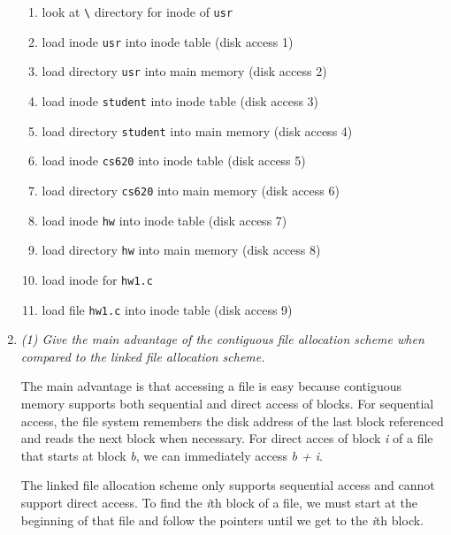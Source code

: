 \documentclass[letterpaper,11pt]{article}
\begin{document}
\begin{enumerate}
\begin{enumerate}
\item look at \verb+\+ directory for inode of \verb+usr+
\item load inode \verb+usr+ into inode table (disk access 1)
\item load directory \verb+usr+ into main memory (disk access 2)
\item load inode \verb+student+ into inode table (disk access 3)
\item load directory \verb+student+ into main memory (disk access 4)
\item load inode \verb+cs620+ into inode table (disk access 5)
\item load directory \verb+cs620+ into main memory (disk access 6)
\item load inode \verb+hw+ into inode table (disk access 7)
\item load directory \verb+hw+ into main memory (disk access 8)
\item load inode for \verb+hw1.c+
\item load file \verb+hw1.c+ into inode table (disk access 9)
\end{enumerate}

\item \emph{(1) Give the main advantage of the contiguous file allocation scheme when compared to the linked file allocation scheme.}
    
The main advantage is that accessing a file is easy because contiguous memory supports both sequential and direct access of blocks.  For sequential access, the file system remembers the disk address of the last block referenced and reads the next block when necessary.  For direct acces of block \textit{i} of a file that starts at block \textit{b}, we can immediately access \textit{b + i}.

The linked file allocation scheme only supports sequential access and cannot support direct access.  To find the \textit{i}th block of a file, we must start at the beginning of that file and follow the pointers until we get to the \textit{i}th block.
\end{enumerate}
\end{document}
